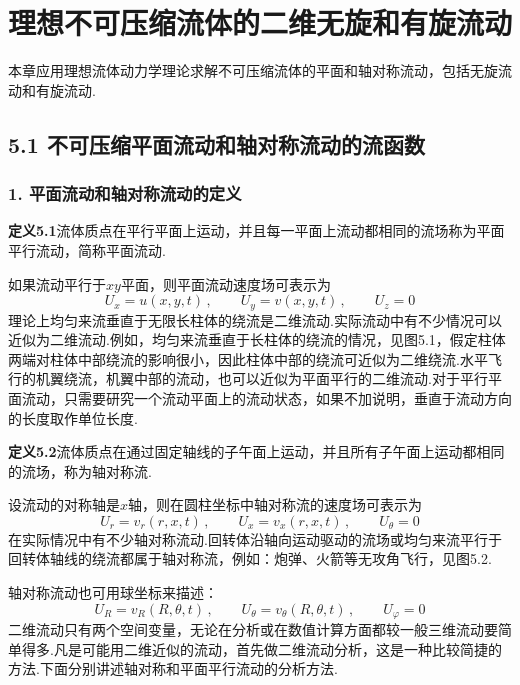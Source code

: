 \chapter{理想不可压缩流体的二维无旋和有旋流动}

本章应用理想流体动力学理论求解不可压缩流体的平面和轴对称流动，包括无旋流动和有旋流动.

\section*{5.1  不可压缩平面流动和轴对称流动的流函数}

\subsection*{1. 平面流动和轴对称流动的定义}

\noindent\textbf{定义5.1}\quad 流体质点在平行平面上运动，并且每一平面上流动都相同的流场称为平面平行流动，简称平面流动.

如果流动平行于$xy$平面，则平面流动速度场可表示为
\begin{equation*}
U_x=u(x,y,t)\,,\qquad U_y=v(x,y,t)\,,\qquad U_z=0
\tag{5.1}
\end{equation*}
理论上均匀来流垂直于无限长柱体的绕流是二维流动.实际流动中有不少情况可以近似为二维流动.例如，均匀来流垂直于长柱体的绕流的情况，见图5.1，假定柱体两端对柱体中部绕流的影响很小，因此柱体中部的绕流可近似为二维绕流.水平飞行的机翼绕流，机翼中部的流动，也可以近似为平面平行的二维流动.对于平行平面流动，只需要研究一个流动平面上的流动状态，如果不加说明，垂直于流动方向的长度取作单位长度.

\noindent\textbf{定义5.2}\quad 流体质点在通过固定轴线的子午面上运动，并且所有子午面上运动都相同的流场，称为轴对称流.

设流动的对称轴是$x$轴，则在圆柱坐标中轴对称流的速度场可表示为
\begin{equation*}
U_r=v_r(r,x,t)\,,\qquad U_x=v_x(r,x,t)\,,\qquad U_\theta=0
\tag{5.2}
\end{equation*}
在实际情况中有不少轴对称流动.回转体沿轴向运动驱动的流场或均匀来流平行于回转体轴线的绕流都属于轴对称流，例如：炮弹、火箭等无攻角飞行，见图5.2.

轴对称流动也可用球坐标来描述：
\begin{equation*}
U_R=v_R(R,\theta,t)\,,\qquad U_\theta=v_\theta(R,\theta,t)\,,\qquad U_\varphi=0
\tag{5.3}
\end{equation*}
二维流动只有两个空间变量，无论在分析或在数值计算方面都较一般三维流动要简单得多.凡是可能用二维近似的流动，首先做二维流动分析，这是一种比较简捷的方法.下面分别讲述轴对称和平面平行流动的分析方法.

